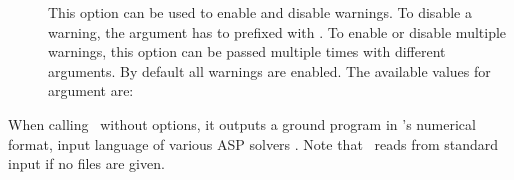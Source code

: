 \begin{description}
\item[]
This option can be used to enable and disable warnings.
To disable a warning, the argument has to prefixed with .
To enable or disable multiple warnings, this option can be passed multiple times with different arguments.
By default all warnings are enabled.
The available values for argument  are:
\end{description}
%
When calling \gringo\ without options,
it outputs a ground program in \smodels's numerical format,
input language of various ASP solvers \cite{gekanesc07b,siniso02a,linzha04a}.
Note that \gringo\ reads from standard input if no files are given.

